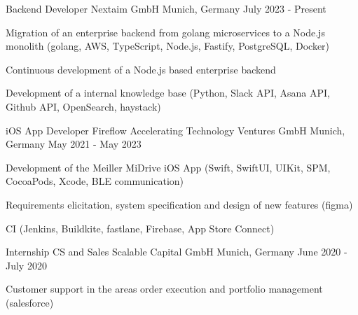 


\begin{cventries}


\cventry
{Backend Developer} %
{Nextaim GmbH} %
{Munich, Germany} %
{July 2023 - Present} %
{ %
\begin{cvitems}
\item {Migration of an enterprise backend from golang microservices to a Node.js monolith (golang, AWS, TypeScript, Node.js, Fastify, PostgreSQL, Docker)}
\item {Continuous development of a Node.js based enterprise backend}
\item {Development of a internal knowledge base (Python, Slack API, Asana API, Github API, OpenSearch, haystack)}
\end{cvitems}
}


\cventry
{iOS App Developer} %
{Fireflow Accelerating Technology Ventures GmbH} %
{Munich, Germany} %
{May 2021 - May 2023} %
{ %
\begin{cvitems}
\item {Development of the Meiller MiDrive iOS App (Swift, SwiftUI, UIKit, SPM, CocoaPods, Xcode, BLE communication)}
\item {Requirements elicitation, system specification and design of new features (figma)}
\item {CI (Jenkins, Buildkite, fastlane, Firebase, App Store Connect)}
\end{cvitems}
}


\cventry
{Internship CS and Sales} %
{Scalable Capital GmbH} %
{Munich, Germany} %
{June 2020 - July 2020} %
{ %
\begin{cvitems}
\item {Customer support in the areas order execution and portfolio management (salesforce)}
\end{cvitems}
}


\end{cventries}
